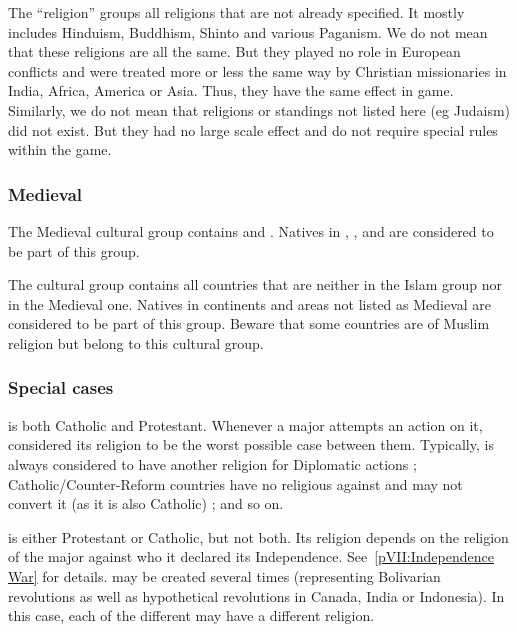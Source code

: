 \aparag The  ``religion'' groups all religions that are not
already specified.
\bparag It mostly includes Hinduism, Buddhism, Shinto and various Paganism.
\bparag We do not mean that these religions are all the same. But they played
no role in European conflicts and were treated more or less the same way by
Christian missionaries in India, Africa, America or Asia. Thus, they have the
same effect in game.
\bparag Similarly, we do not mean that religions or standings not listed here
(eg Judaism) did not exist. But they had no large scale effect and do not
require special rules within the game.


\subsubsection{Medieval}
\aparag The Medieval cultural group contains \paysInca and \paysAzteque.
\bparag Natives in %
\continentAfrica, \continentSiberia, \granderegionOceania and
\granderegionPacifique are considered to be part of this group.

\subsubsectionJ{\ROTW}{\techrotw}
\aparag The \ROTW cultural group contains all \ROTW countries that are neither
in the Islam group nor in the Medieval one.
\bparag Natives in continents and areas not listed as Medieval are considered
to be part of this group.
\bparag Beware that some \ROTW countries are of Muslim religion but belong to
this cultural group.


\subsubsection{Special cases}
\aparag \paysSuisse is both Catholic and Protestant.
\bparag Whenever a major attempts an action on it, considered its religion to
be the worst possible case between them.
\bparag Typically, \paysSuisse is always considered to have another religion
for Diplomatic actions ; Catholic/Counter-Reform countries have no religious
\CB against \paysSuisse and may not convert it (as it is also Catholic) ; and
so on.

\aparag \paysUSA is either Protestant or Catholic, but not both.
\bparag Its religion depends on the religion of the major against who it
declared its Independence. See~\ref{pVII:Independence War} for details.
\bparag \paysUSA may be created several times (representing Bolivarian
revolutions as well as hypothetical revolutions in Canada, India or
Indonesia). In this case, each of the different \paysUSA may have a different
religion.



